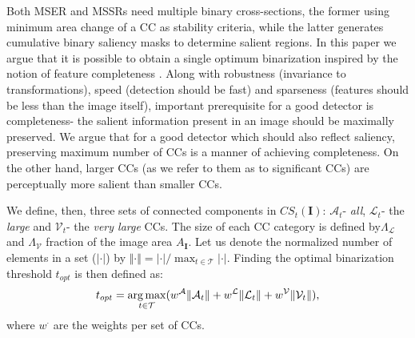 \documentclass[conference,compsoc]{IEEEtran}
\def\I{{\mathbf I}}
\def\mcT{{\mathcal{T}}}
\def\mcA{{\mathcal{A}}}
\def\mcL{{\mathcal{L}}}
\def\mcV{{\mathcal{V}}}
\DeclareMathOperator*{\argmax}{arg\,max}
\begin{document}
Both MSER and MSSRs need multiple binary cross-sections, the former using minimum area change of a CC as stability criteria, while the latter generates cumulative binary saliency masks to determine salient regions. In this paper we argue that it is possible to obtain a single optimum binarization inspired by the notion of feature completeness \cite{Dickscheid2011}. Along with robustness (invariance to transformations), speed (detection should be fast) and sparseness (features should be less than the image itself), important prerequisite for a good detector is completeness- the salient information present in an image should be maximally preserved. We argue that for a good detector which should also reflect saliency, preserving maximum number of CCs is a manner of achieving completeness. On the other hand, larger CCs (as we refer to them as to significant CCs) are perceptually more salient than smaller CCs. 

We define, then, three sets of connected components in $CS_t(\I)$: $\mcA_t$- {\em all}, $\mcL_t$- the {\em large} and $\mcV_t$- the {\em very large} CCs.  The size of each CC category is defined by$\Lambda_{\mcL}$ and $\Lambda_{\mcV}$ fraction of the image area $A_{\I}$. Let us denote the normalized number of elements in a set ($|\cdot|$) by $\Vert \cdot \Vert = |\cdot| / \max_{t \in \mcT}|\cdot|$.
Finding the optimal binarization threshold $t_{opt}$ is then defined as:
\begin{equation*}
\vspace{-0.05cm}
t_{opt} = \argmax_{t \in \mcT}( w^{\mcA} \Vert \mcA_t \Vert + w^{\mcL} \Vert \mcL_t \Vert + w^{\mcV} \Vert \mcV_t \Vert ),
\vspace{-0.05cm}
\end{equation*}
where $w^{\cdot}$ are the weights per set of CCs.  
\end{document}
